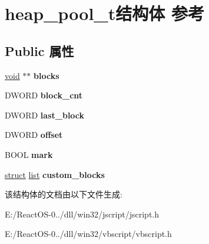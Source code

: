 \hypertarget{structheap__pool__t}{}\section{heap\+\_\+pool\+\_\+t结构体 参考}
\label{structheap__pool__t}
\subsection*{Public 属性}
\begin{DoxyCompactItemize}
\item 
\mbox{\label{structheap__pool__t_a9748166368e24d7bb630273229b7910f}} 
\hyperlink{interfacevoid}{void} $\ast$$\ast$ {\bfseries blocks}
\item 
\mbox{\label{structheap__pool__t_a8f1063d127c2828f64d6996673f762f8}} 
D\+W\+O\+RD {\bfseries block\+\_\+cnt}
\item 
\mbox{\label{structheap__pool__t_aecbbcd4eae74da6e1bc0f1773e8065ea}} 
D\+W\+O\+RD {\bfseries last\+\_\+block}
\item 
\mbox{\label{structheap__pool__t_a18995d4351073799718fc71e0822a0ab}} 
D\+W\+O\+RD {\bfseries offset}
\item 
\mbox{\label{structheap__pool__t_abe2a7bae0dadd27173fd6fa390d46764}} 
B\+O\+OL {\bfseries mark}
\item 
\mbox{\label{structheap__pool__t_ac58fd6fb125332396119d6a3cba8b9b7}} 
\hyperlink{interfacestruct}{struct} \hyperlink{classlist}{list} {\bfseries custom\+\_\+blocks}
\end{DoxyCompactItemize}


该结构体的文档由以下文件生成\+:\begin{DoxyCompactItemize}
\item 
E\+:/\+React\+O\+S-\/0../dll/win32/jscript/jscript.\+h\item 
E\+:/\+React\+O\+S-\/0../dll/win32/vbscript/vbscript.\+h\end{DoxyCompactItemize}
